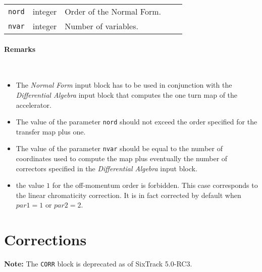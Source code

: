 \bigskip
\begin{tabular}{@{}llp{0.7\linewidth}}
    \texttt{nord} & integer & Order of the Normal Form. \\
    \texttt{nvar} & integer & Number of variables.
\end{tabular}

\paragraph{Remarks}~
\begin{itemize}
    \item The \textit{Normal Form} input block has to be used in conjunction with the \textit{Differential Algebra} input block that computes the one turn map of the accelerator.
    \item The value of the parameter \texttt{nord} should not exceed the order specified for the transfer map plus one.
    \item The value of the parameter \texttt{nvar} should be equal to the number of coordinates used to compute the map plus eventually the number of correctors specified in the \textit{Differential Algebra} input block.
    \item the value $1$ for the off-momentum order is forbidden. This case corresponds to the linear chromaticity correction. It is in fact corrected by default when $par1 =1$ or $par2 =2$.
\end{itemize}

\section{Corrections} \label{Corrections}

\textcolor{notered}{\textbf{Note:}
The \texttt{CORR} block is deprecated as of SixTrack 5.0-RC3.}



